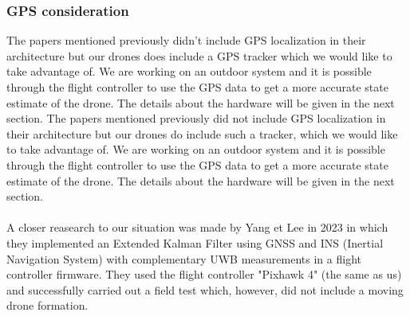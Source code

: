 \subsubsection{GPS consideration}

The papers mentioned previously didn't include GPS localization in their architecture but our drones does include a GPS tracker which we would like to take advantage of. We are working on an outdoor system and it is possible through the flight controller to use the GPS data to get a more accurate state estimate of the drone. The details about the hardware will be given in the next section. 
The papers mentioned previously did not include GPS localization in their architecture but our drones do include such a tracker, which we would like to take advantage of. We are working on an outdoor system and it is possible through the flight controller to use the GPS data to get a more accurate state estimate of the drone. The details about the hardware will be given in the next section. 
\\

\\

A closer reasearch to our situation was made by Yang et Lee in 2023 \parencite{yang_ultrawideband_2023} in which they implemented an Extended Kalman Filter using GNSS and INS (Inertial Navigation System) with complementary UWB measurements in a flight controller firmware. They used the flight controller "Pixhawk 4" (the same as us) and successfully carried out a field test which, however, did not include a moving drone formation. 

\color{black}

\newpage
